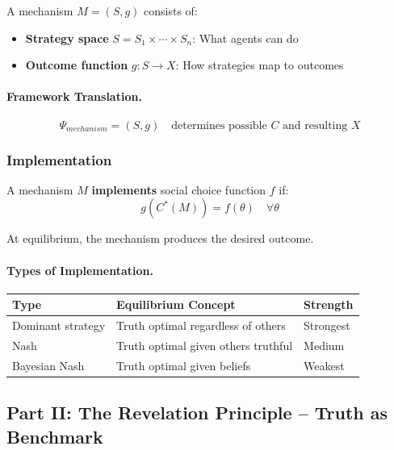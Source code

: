 A mechanism $M = (S, g)$ consists of:
\begin{itemize}
    \item \textbf{Strategy space} $S = S_1 \times \cdots \times S_n$: What agents can do
    \item \textbf{Outcome function} $g: S \to X$: How strategies map to outcomes
\end{itemize}

\paragraph{Framework Translation.}
\begin{equation}
\Psi_{mechanism} = (S, g) \quad \text{determines possible } C \text{ and resulting } X
\end{equation}

\subsubsection{Implementation}

A mechanism $M$ \textbf{implements} social choice function $f$ if:
\begin{equation}
g(C^*(M)) = f(\theta) \quad \forall \theta
\end{equation}

At equilibrium, the mechanism produces the desired outcome.

\paragraph{Types of Implementation.}
\begin{center}
\renewcommand{\arraystretch}{1.3}
\begin{tabular}{|l|l|l|}
\hline
\textbf{Type} & \textbf{Equilibrium Concept} & \textbf{Strength} \\
\hline
Dominant strategy & Truth optimal regardless of others & Strongest \\
Nash & Truth optimal given others truthful & Medium \\
Bayesian Nash & Truth optimal given beliefs & Weakest \\
\hline
\end{tabular}
\end{center}

\subsection{Part II: The Revelation Principle – Truth as Benchmark}

